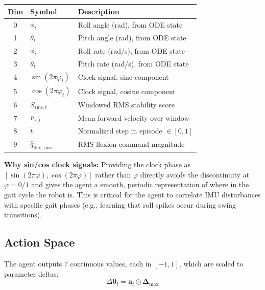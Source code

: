 \documentclass[11pt]{article}
\begin{document}
\begin{center}
\begin{tabular}{clp{7cm}}
\toprule
\textbf{Dim} & \textbf{Symbol} & \textbf{Description} \\
\midrule
0 & $\phi_t$ & Roll angle (rad), from ODE state \\
1 & $\theta_t$ & Pitch angle (rad), from ODE state \\
2 & $\dot\phi_t$ & Roll rate (rad/s), from ODE state \\
3 & $\dot\theta_t$ & Pitch rate (rad/s), from ODE state \\
4 & $\sin(2\pi\varphi_t)$ & Clock signal, sine component \\
5 & $\cos(2\pi\varphi_t)$ & Clock signal, cosine component \\
6 & $S_{\mathrm{rms},t}$ & Windowed RMS stability score \\
7 & $\bar{v}_{x,t}$ & Mean forward velocity over window \\
8 & $\tilde{t}$ & Normalized step in episode $\in[0,1]$ \\
9 & $\hat{q}_{\mathrm{flex,rms}}$ & RMS flexion command magnitude \\
\bottomrule
\end{tabular}
\end{center}

\textbf{Why sin/cos clock signals:} Providing the clock phase as $[\sin(2\pi\varphi), \cos(2\pi\varphi)]$ rather than $\varphi$ directly avoids the discontinuity at $\varphi=0/1$ and gives the agent a smooth, periodic representation of where in the gait cycle the robot is. This is critical for the agent to correlate IMU disturbances with specific gait phases (e.g., learning that roll spikes occur during swing transitions).

\subsection{Action Space}
\label{sec:action-space}

The agent outputs 7 continuous values, each in $[-1, 1]$, which are scaled to parameter deltas:
\begin{equation}
\Delta\boldsymbol{\theta}_t = \mathbf{a}_t \odot \boldsymbol{\Delta}_{\max}
\label{eq:action}
\end{equation}
\end{document}
